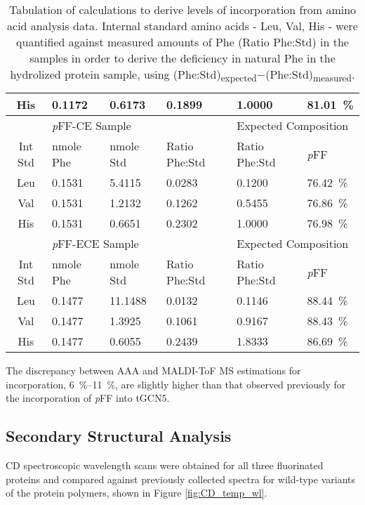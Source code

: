 \begin{refsection}
\begin{table}[h!]
\begin{tabular}{ clllll }
  His & 0.1172 & 0.6173 & 0.1899 & 1.0000 & \SI{81.01}{\percent} \\
  \hline
  &
  \multicolumn{3}{l}{\emph{p}FF-CE Sample} &
  \multicolumn{2}{l}{Expected Composition} \\
  \hline
  Int Std & nmole Phe & nmole Std & Ratio Phe:Std & Ratio Phe:Std& \emph{p}FF \\
  Leu & 0.1531 & 5.4115 & 0.0283 & 0.1200 & \SI{76.42}{\percent} \\
  Val & 0.1531 & 1.2132 & 0.1262 & 0.5455 & \SI{76.86}{\percent} \\
  His & 0.1531 & 0.6651 & 0.2302 & 1.0000 & \SI{76.98}{\percent} \\
  \hline
  &
  \multicolumn{3}{l}{\emph{p}FF-ECE Sample} &
  \multicolumn{2}{l}{Expected Composition} \\
  \hline
  Int Std & nmole Phe & nmole Std & Ratio Phe:Std & Ratio Phe:Std& \emph{p}FF \\
  Leu & 0.1477 & 11.1488 & 0.0132 & 0.1146 & \SI{88.44}{\percent} \\
  Val & 0.1477 & 1.3925 & 0.1061 & 0.9167 & \SI{88.43}{\percent} \\
  His & 0.1477 & 0.6055 & 0.2439 & 1.8333 & \SI{86.69}{\percent} \\
  \hline
\end{tabular}
\caption{Tabulation of calculations to derive levels of incorporation from amino
acid analysis data. Internal standard amino acids - Leu, Val, His - were
quantified against measured amounts of Phe (Ratio Phe:Std) in the samples in
order to derive the deficiency in natural Phe in the hydrolized protein sample,
using
(Phe:Std)\textsubscript{expected}${-}$(Phe:Std)\textsubscript{measured}.}
\label{tab:aaa_analysis}
\end{table}
The discrepancy between AAA and MALDI-ToF MS estimations for incorporation,
\SIrange[range-phrase=--]{6}{11}{\percent}, are slightly higher than that
observed previously for the incorporation of \emph{p}FF into tGCN5.\cite{Voloshchuk2009}

\subsection{Secondary Structural Analysis}
CD spectroscopic wavelength scans were obtained for all three fluorinated
proteins and compared against previously collected spectra for wild-type
variants of the protein polymers, shown in Figure
\ref{fig:CD_temp_wl}.\cite{Haghpanah2009} 


\end{refsection}
